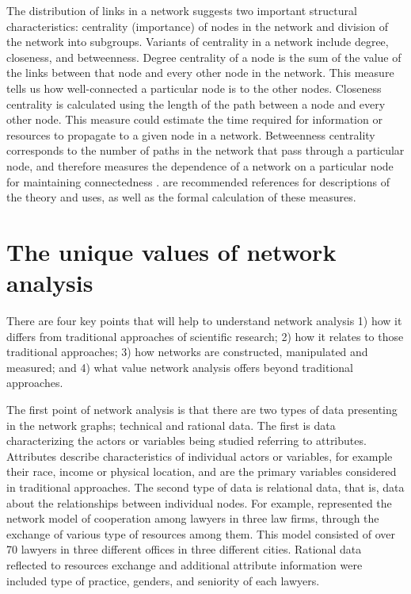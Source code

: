 The distribution of links in a network suggests two important structural characteristics: centrality (importance) of nodes in the network and division of the network into subgroups. Variants of centrality in a network include degree, closeness, and betweenness. Degree centrality of a node is the sum of the value of the links between that node and every other node in the network. This measure tells us how well-connected a particular node is to the other nodes. Closeness centrality is calculated using the length of the path between a node and every other node. This measure could estimate the time required for information or resources to propagate to a given node in a network. Betweenness centrality corresponds to the number of paths in the network that pass through a particular node, and therefore measures the dependence of a network on a particular node for maintaining connectedness .  are recommended references for descriptions of the theory and uses, as well as the formal calculation of these measures.


\section*{The unique values of network analysis}

There are four key points that will help to understand network analysis 1) how it differs from traditional approaches of scientific research; 2) how it relates to those traditional approaches; 3) how networks are constructed, manipulated and measured; and 4) what value network analysis offers beyond traditional approaches.

The first point of network analysis is that there are two types of data presenting in the network graphs; technical and rational data. The first is data characterizing the actors or variables being studied referring to attributes. Attributes describe characteristics of individual actors or variables, for example their race, income or physical location, and are the primary variables considered in traditional approaches. The second type of data is relational data, that is, data about the relationships between individual nodes. For example,  represented the network model of cooperation among lawyers in three law firms, through the exchange of various type of resources among them. This model consisted of over 70 lawyers in three different offices in three different cities. Rational data reflected to resources exchange and additional attribute information were included type of practice, genders, and seniority of each lawyers.

